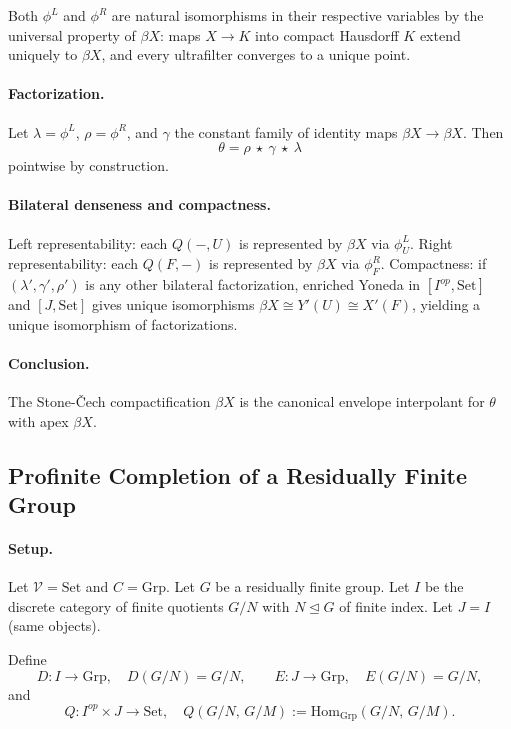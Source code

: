 \documentclass[11pt]{article}
\theoremstyle{plain}
\theoremstyle{definition}
\theoremstyle{remark}
\newcommand{\V}{\mathcal{V}}
\newcommand{\Hom}{\mathrm{Hom}}
\newcommand{\Set}{\mathrm{Set}}
\newcommand{\Grp}{\mathrm{Grp}}
\begin{document}
Both $\phi^L$ and $\phi^R$ are natural isomorphisms in their respective variables
by the universal property of $\beta X$: maps $X\to K$ into compact Hausdorff $K$
extend uniquely to $\beta X$, and every ultrafilter converges to a unique point.

\paragraph{Factorization.}
Let $\lambda = \phi^L$, $\rho = \phi^R$, and $\gamma$ the constant family of
identity maps $\beta X \to \beta X$. Then
$$
\theta = \rho \ \star\ \gamma \ \star\ \lambda
$$
pointwise by construction.

\paragraph{Bilateral denseness and compactness.}
Left representability: each $Q(-,U)$ is represented by $\beta X$ via $\phi^L_U$.
Right representability: each $Q(F,-)$ is represented by $\beta X$ via $\phi^R_F$.
Compactness: if $(\lambda',\gamma',\rho')$ is any other bilateral factorization,
enriched Yoneda in $[I^{op},\Set]$ and $[J,\Set]$ gives unique isomorphisms
$\beta X \cong Y'(U) \cong X'(F)$, yielding a unique isomorphism of factorizations.

\paragraph{Conclusion.}
The Stone-\v{C}ech compactification $\beta X$ is the canonical envelope interpolant
for $\theta$ with apex $\beta X$.

\subsection{Profinite Completion of a Residually Finite Group}\label{ssec:profinite}

\paragraph{Setup.}
Let $\V=\Set$ and $C=\Grp$. Let $G$ be a residually finite group. Let $I$ be the
discrete category of finite quotients $G/N$ with $N\trianglelefteq G$ of finite index.
Let $J=I$ (same objects).

Define
$$
D:I \to \Grp,\quad D(G/N) = G/N,\qquad E:J\to\Grp,\quad E(G/N) = G/N,
$$
and
$$
Q: I^{op} \times J \to \Set,\quad
Q(G/N,\,G/M) :=
\Hom_{\Grp}(G/N,\, G/M).
$$
\end{document}
